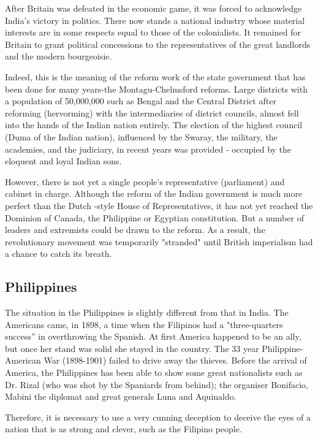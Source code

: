 After Britain was defeated in the economic game, it was forced to acknowledge 
India's victory in politics. There now stands a national industry whose material 
interests are in some respects equal to those of the colonialists. It remained for 
Britain to grant political concessions to the representatives of the great landlords and the modern bourgeoisie.\nline

Indeed, this is the meaning of the reform work of the state government that has been 
done for many years-the Montagu-Chelmsford reforms. Large districts with a population 
of 50,000,000 such as Bengal and the Central District after reforming (hervorming) 
with the intermediaries of district councils, almost fell into the hands of the Indian 
nation entirely. The election of the highest council (Duma of the Indian nation), 
influenced by the Swaray, the military, the academies, and the judiciary, in recent 
years was provided - occupied by the eloquent and loyal Indian sons.\nline

However, there is not yet a single people's representative (parliament) 
and cabinet in charge. Although the reform of the Indian government is much 
more perfect than the Dutch -style House of Representatives, it has not yet 
reached the Dominion of Canada, the Philippine or Egyptian constitution. But a 
number of leaders and extremists could be drawn to the reform. As a result, the 
revolutionary movement was temporarily "stranded" until British imperialism had a chance to catch its breath.\nline

\subsection{Philippines}

The situation in the Philippines is slightly different from that in India. 
The Americans came, in 1898, a time when the Filipinos had a "three-quarters success” 
in overthrowing the Spanish. At first America happened to be an ally, but once her stand 
was solid she stayed in the country. The 33 year Philippine-American War (1898-1901) 
failed to drive away the thieves. Before the arrival of America, the Philippines has 
been able to show some great nationalists such as Dr. Rizal (who was shot by the Spaniards from behind); 
the organiser Bonifacio, Mabini the diplomat and great generals Luna and Aquinaldo.\nline

Therefore, it is necessary to use a very cunning deception to deceive the eyes of a 
nation that is as strong and clever, such as the Filipino people.\nline

